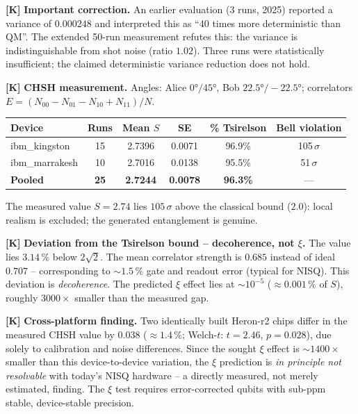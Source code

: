 \textbf{[K]} \textbf{Important correction.} An earlier evaluation (3 runs, 2025)
reported a variance of $0{.}000248$ and interpreted this as ``40 times more
deterministic than QM''. The extended 50-run measurement refutes this: the variance
is indistinguishable from shot noise (ratio $1{.}02$). Three runs were statistically
insufficient; the claimed deterministic variance reduction does not hold.

\textbf{[K]} \textbf{CHSH measurement.} Angles: Alice $0°/45°$, Bob
$22{.}5°/{-}22{.}5°$; correlators $E=(N_{00}-N_{01}-N_{10}+N_{11})/N$.

\begin{center}
\renewcommand{\arraystretch}{1.3}
{\small
\begin{tabular}{lccccc}
\toprule
Device & Runs & Mean $S$ & SE & \% Tsirelson & Bell violation \\
\midrule
ibm\_kingston  & 15 & 2.7396 & 0.0071 & 96.9\% & 105\,$\sigma$ \\
ibm\_marrakesh & 10 & 2.7016 & 0.0138 & 95.5\% & 51\,$\sigma$ \\
\textbf{Pooled} & \textbf{25} & \textbf{2.7244} & \textbf{0.0078}
                 & \textbf{96.3\%} & --- \\
\bottomrule
\end{tabular}
}
\renewcommand{\arraystretch}{1.0}
\end{center}

The measured value $S=2{.}74$ lies $105\,\sigma$ above the classical bound ($2{.}0$):
local realism is excluded; the generated entanglement is genuine.

\textbf{[K]} \textbf{Deviation from the Tsirelson bound -- decoherence, not $\xi$.}
The value lies $3{.}14\,\%$ below $2\sqrt2$. The mean correlator strength is
$0{.}685$ instead of ideal $0{.}707$ -- corresponding to $\sim1{.}5\,\%$ gate and
readout error (typical for NISQ). This deviation is \emph{decoherence}. The
predicted $\xi$ effect lies at $\sim10^{-5}$ ($\approx0{.}001\,\%$ of $S$), roughly
$3000\times$ smaller than the measured gap.

\textbf{[K]} \textbf{Cross-platform finding.} Two identically built Heron-r2 chips
differ in the measured CHSH value by $0{.}038$ ($\approx1{.}4\,\%$; Welch-$t$:
$t=2{.}46$, $p=0{.}028$), due solely to calibration and noise differences. Since
the sought $\xi$ effect is $\sim1400\times$ smaller than this device-to-device
variation, the $\xi$ prediction is \emph{in principle not resolvable} with today's
NISQ hardware -- a directly measured, not merely estimated, finding. The $\xi$
test requires error-corrected qubits with sub-ppm stable, device-stable precision.

